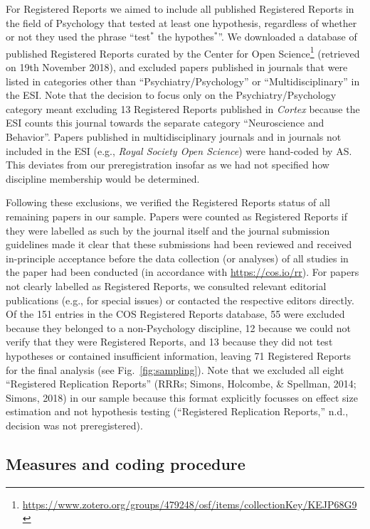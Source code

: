 \documentclass[british,,jou,floatsintext]{apa6}
\begin{document}
For Registered Reports we aimed to include all published Registered Reports in the field of Psychology that tested at least one hypothesis, regardless of whether or not they used the phrase \enquote{test\(^\ast\) the hypothes\(^\ast\)}.
We downloaded a database of published Registered Reports curated by the Center for Open Science\footnote{\url{https://www.zotero.org/groups/479248/osf/items/collectionKey/KEJP68G9}} (retrieved on 19th November 2018), and excluded papers published in journals that were listed in categories other than \enquote{Psychiatry/Psychology} or \enquote{Multidisciplinary} in the ESI.
Note that the decision to focus only on the Psychiatry/Psychology category meant excluding 13 Registered Reports published in \emph{Cortex} because the ESI counts this journal towards the separate category \enquote{Neuroscience and Behavior}.
Papers published in multidisciplinary journals and in journals not included in the ESI (e.g., \emph{Royal Society Open Science}) were hand-coded by AS.
This deviates from our preregistration insofar as we had not specified how discipline membership would be determined.

Following these exclusions, we verified the Registered Reports status of all remaining papers in our sample.
Papers were counted as Registered Reports if they were labelled as such by the journal itself and the journal submission guidelines made it clear that these submissions had been reviewed and received in-principle acceptance before the data collection (or analyses) of all studies in the paper had been conducted (in accordance with \url{https://cos.io/rr}).
For papers not clearly labelled as Registered Reports, we consulted relevant editorial publications (e.g., for special issues) or contacted the respective editors directly.
Of the 151 entries in the COS Registered Reports database, 55 were excluded because they belonged to a non-Psychology discipline, 12 because we could not verify that they were Registered Reports, and 13 because they did not test hypotheses or contained insufficient information, leaving 71 Registered Reports for the final analysis (see Fig.~\ref{fig:sampling}).
Note that we excluded all eight \enquote{Registered Replication Reports} (RRRs; Simons, Holcombe, \& Spellman, 2014; Simons, 2018) in our sample because this format explicitly focusses on effect size estimation and not hypothesis testing (``Registered Replication Reports,'' n.d., decision was not preregistered).

\hypertarget{measures-and-coding-procedure}{%
\subsection{Measures and coding procedure}\label{measures-and-coding-procedure}}
\end{document}
